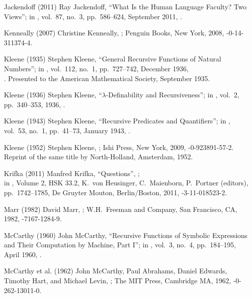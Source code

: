  Jackendoff (2011)
Ray Jackendoff,
``What Is the Human Language Faculty? Two Views'';
in ,
vol.\ 87, no.\ 3, pp.\ 586--624, September 2011,
.

 Kenneally (2007)
Christine Kenneally,
;
Penguin Books, New York, 2008,
-0-14-311374-4.

 Kleene (1935)
Stephen Kleene,
``General Recursive Functions of Natural Numbers'';
in ,
vol.\ 112, no.\ 1, pp.\ 727--742, December 1936,\\
.
Presented to the American Mathematical Society,
September 1935.

 Kleene (1936)
Stephen Kleene,
``$\lambda$-Definability and Recursiveness'';
in ,
vol.\ 2, pp.\ 340--353, 1936,
.

 Kleene (1943)
Stephen Kleene,
``Recursive Predicates and Quantifiers'';
in ,
vol.\ 53, no.\ 1, pp.\ 41--73, January 1943,
.

 Kleene (1952)
Stephen Kleene,
;
Ishi Press, New York, 2009,
-0-923891-57-2.
Reprint of the same title by
North-Holland, Amsterdam, 1952.

 Krifka (2011)
Manfred Krifka,
``Questions'',
;\\
in ,
 Volume 2, HSK 33.2,
 K.\ von Heusinger, C.\ Maienborn, P.\ Portner (editors),
pp.\ 1742--1785,
De Gruyter Mouton, Berlin/Boston, 2011,
-3-11-018523-2.

 Marr (1982)
David Marr,
;
W.H.\ Freeman and Company, San Francisco, CA, 1982,
-7167-1284-9.

 McCarthy (1960)
John McCarthy,
``Recursive Functions of Symbolic Expressions
and Their Computation by Machine, Part I'';
in ,
vol.\ 3, no.\ 4, pp.\ 184--195, April 1960,
.

 McCarthy et al. (1962)
John McCarthy, Paul Abrahams, Daniel Edwards,
Timothy Hart, and Michael Levin,
 ;
The MIT Press, Cambridge MA, 1962,
-0-262-13011-0.

